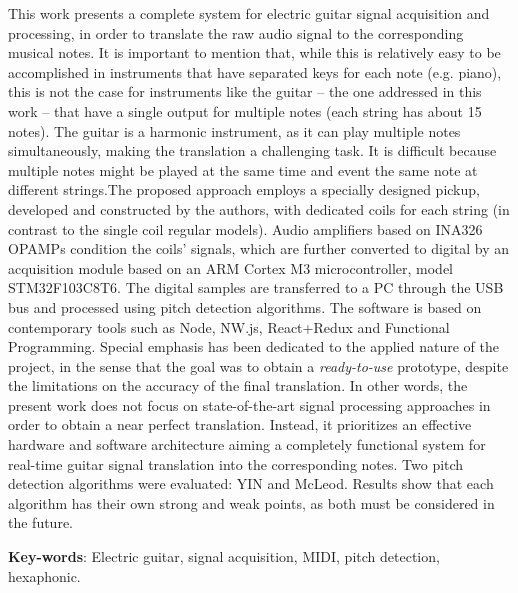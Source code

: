\setlength{\absparsep}{18pt} %

\begin{summary}[Abstract]
This work presents a complete system for electric guitar signal acquisition and processing, in order to translate
the raw audio signal to the corresponding musical notes. It is important to mention that, while this is
relatively easy to be accomplished in instruments that have separated keys for each note (e.g. piano),
this is not the case for instruments like the guitar – the one addressed in this work – that have a single
output for multiple notes (each string has about 15 notes). The guitar is a harmonic instrument, as it can
play multiple notes simultaneously, making the translation a challenging task. It is difficult because
multiple notes might be played at the same time and event the same note at different strings.The proposed
approach employs a specially designed pickup, developed and constructed by the authors, with dedicated coils for
each string (in contrast to the single coil regular models). Audio amplifiers based on INA326 OPAMPs
condition the coils’ signals, which are further converted to digital by an acquisition module based on an
ARM Cortex M3 microcontroller, model STM32F103C8T6. The digital samples are transferred to a PC
through the USB bus and processed using pitch detection algorithms. The software is based on
contemporary tools such as Node, NW.js, React+Redux and Functional Programming. Special emphasis
has been dedicated to the applied nature of the project, in the sense that the goal was to obtain a
\emph{ready-to-use} prototype, despite the limitations on the accuracy of the final translation. In other
words, the present work does not focus on state-of-the-art signal processing approaches in order to
obtain a near perfect translation. Instead, it prioritizes an effective hardware and software architecture
aiming a completely functional system for real-time guitar signal translation into the corresponding
notes. Two pitch detection algorithms were evaluated: YIN and McLeod. Results show that each algorithm
has their own strong and weak points, as both must be considered in the future.


  \textbf{Key-words}: Electric guitar, signal acquisition, MIDI, pitch detection, hexaphonic.
\end{summary}

